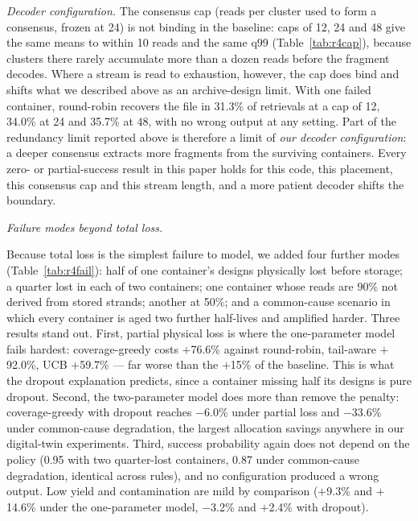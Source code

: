 \documentclass[conference,onecolumn,11pt]{IEEEtran}
\begin{document}
\emph{Decoder configuration.}  The consensus cap (reads per cluster
used to form a consensus, frozen at 24) is not binding in the baseline: caps of 12, 24 and 48 give the
same means to within 10 reads and the same q99 (Table~\ref{tab:r4cap}), because clusters there rarely
accumulate more than a dozen reads before the fragment decodes.  Where a stream is read to exhaustion,
however, the cap does bind and shifts what we described above as an archive-design limit.  With one
failed container, round-robin recovers the file in 31.3\% of retrievals at a cap of 12, 34.0\% at 24 and
35.7\% at 48, with no wrong output at any setting.  Part of the redundancy limit reported above is
therefore a limit of \emph{our decoder configuration}: a deeper consensus extracts more fragments from
the surviving containers.  Every zero- or partial-success result in this paper holds for this code, this
placement, this consensus cap and this stream length, and a more patient decoder shifts the boundary.

\emph{Failure modes beyond total loss.}

Because total loss is the simplest failure to model, we added four further modes
(Table~\ref{tab:r4fail}): half of one container's designs physically lost before storage; a quarter lost
in each of two containers; one container whose reads are 90\% not derived from stored strands; another at
50\%; and a common-cause scenario in which every container is aged two further half-lives and amplified
harder.  Three results stand out.  First, partial physical loss is where the one-parameter model fails
hardest: coverage-greedy costs $+$76.6\% against round-robin, tail-aware $+$92.0\%, UCB $+$59.7\% --- far
worse than the $+$15\% of the baseline.  This is what the dropout explanation predicts, since a
container missing half its designs is pure dropout.  Second, the two-parameter model does more than
remove the penalty: coverage-greedy with dropout reaches $-$6.0\% under partial loss and $-$33.6\% under common-cause
degradation, the largest allocation savings anywhere in our digital-twin experiments.  Third, success
probability again does not depend on the policy (0.95 with two quarter-lost containers, 0.87 under
common-cause degradation, identical across rules), and no configuration produced a wrong output.  Low
yield and contamination are mild by comparison ($+$9.3\% and $+$14.6\% under the one-parameter model,
$-$3.2\% and $+$2.4\% with dropout).
\end{document}
